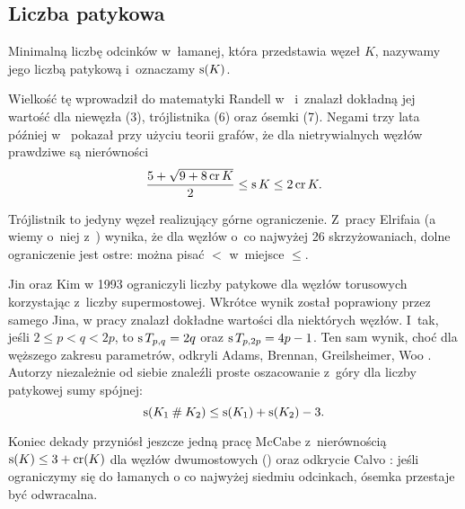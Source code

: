 
\subsection{Liczba patykowa}
%


\begin{definition}
    Minimalną liczbę odcinków w~łamanej, która przedstawia węzeł $K$, nazywamy jego liczbą patykową i~oznaczamy $\operatorname{s}(K)$.
\end{definition}

Wielkość tę wprowadził do matematyki Randell w~\cite{randell98} i~znalazł dokładną jej wartość dla niewęzła (3), trójlistnika (6) oraz ósemki (7).
%
Negami trzy lata później w~\cite{negami91} pokazał przy użyciu teorii grafów, że dla nietrywialnych węzłów prawdziwe są nierówności
%
\begin{equation}
    \frac{5+\sqrt{9 + 8 \operatorname{cr} K}}{2} \le \operatorname{s} K \le 2 \operatorname{cr} K.
\end{equation}

Trójlistnik to jedyny węzeł realizujący górne ograniczenie.
Z~pracy Elrifaia \cite{elrifai06} (a wiemy o~niej z~\cite[s. 1]{huh11}) wynika, że dla węzłów o~co najwyżej 26 skrzyżowaniach, dolne ograniczenie jest ostre: można pisać $<$ w~miejsce $\le$.
%

Jin oraz Kim w 1993 ograniczyli liczby patykowe dla węzłów torusowych korzystając z~liczby supermostowej.
%
%
Wkrótce wynik został poprawiony przez samego Jina, w pracy \cite{jin97} znalazł dokładne wartości dla niektórych węzłów.
I~tak, jeśli $2 \le p < q < 2p$, to $\operatorname{s} T_{p,q} = 2q$ oraz $\operatorname{s} T_{p, 2p} = 4p-1$.
Ten sam wynik, choć dla węższego zakresu parametrów, odkryli Adams, Brennan, Greilsheimer, Woo \cite{greilsheimer97}.
%
%
%
%
%
Autorzy niezależnie od siebie znaleźli proste oszacowanie z~góry dla liczby patykowej sumy spójnej:
\begin{equation}
    \operatorname{s}(K_1 \mathbin{\#} K_2) \le \operatorname{s}(K_1) + \operatorname{s}(K_2) - 3.
\end{equation}

Koniec dekady przyniósł jeszcze jedną pracę McCabe z~nierównością $\operatorname{s}(K) \le 3 + \operatorname{cr} (K)$ dla węzłów dwumostowych (\cite{mccabe98}) oraz odkrycie Calvo \cite{calvo01}: jeśli ograniczymy się do łamanych o co najwyżej siedmiu odcinkach, ósemka przestaje być odwracalna.
%
%

